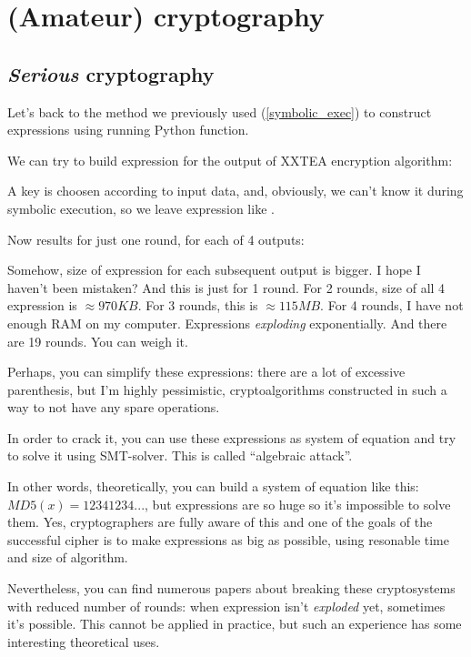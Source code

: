 \section{(Amateur) cryptography}
\label{crypto}

\subsection{\textit{Serious} cryptography}

Let's back to the method we previously used (\ref{symbolic_exec}) to construct expressions using running Python function.

We can try to build expression for the output of XXTEA encryption algorithm:



A key is choosen according to input data, and, obviously, we can't know it during symbolic execution, so we leave expression like .

Now results for just one round, for each of 4 outputs:



Somehow, size of expression for each subsequent output is bigger. I hope I haven't been mistaken?
And this is just for 1 round.
For 2 rounds, size of all 4 expression is $\approx 970KB$.
For 3 rounds, this is $\approx 115MB$.
For 4 rounds, I have not enough RAM on my computer.
Expressions \textit{exploding} exponentially.
And there are 19 rounds.
You can weigh it.

Perhaps, you can simplify these expressions: there are a lot of excessive parenthesis,
but I'm highly pessimistic, cryptoalgorithms constructed in such a way to not have any spare operations.

In order to crack it, you can use these expressions as system of equation and try to solve it using SMT-solver.
This is called ``algebraic attack''.

In other words, theoretically, you can build a system of equation like this: $MD5(x)=12341234...$,
but expressions are so huge so it's impossible to solve them.
Yes, cryptographers are fully aware of this and one of the goals of the successful cipher is
to make expressions as big as possible, using resonable time and size of algorithm.

Nevertheless, you can find numerous papers about breaking these cryptosystems with reduced number of rounds:
when expression isn't \textit{exploded} yet, sometimes it's possible.
This cannot be applied in practice, but such an experience has some interesting theoretical uses.

